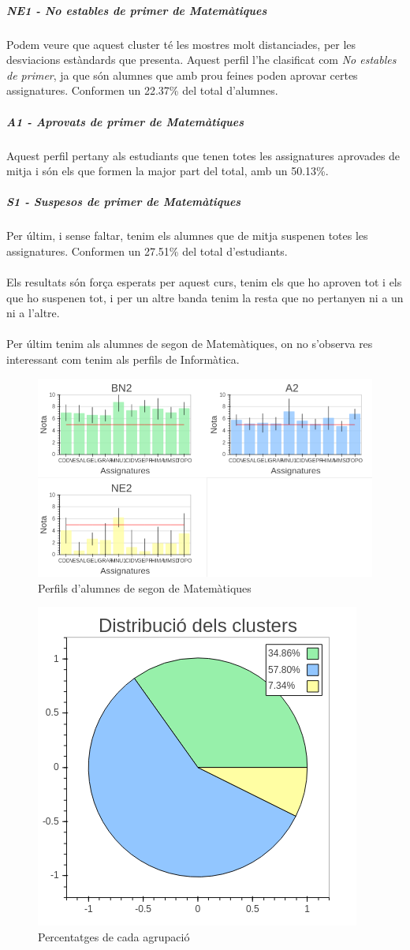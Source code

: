 \documentclass[12pt,a4paper,catalan]{article}
\begin{document}
\subparagraph{NE1 - No estables de primer de Matemàtiques}
Podem veure que aquest cluster té les mostres molt distanciades, per les desviacions estàndards que presenta. Aquest perfil l'he clasificat com \textit{No estables de primer}, ja que són alumnes que amb prou feines poden aprovar certes assignatures. Conformen un 22.37\% del total d'alumnes.

\subparagraph{A1 - Aprovats de primer de Matemàtiques}
Aquest perfil pertany als estudiants que tenen totes les assignatures aprovades  de mitja i són els que formen la major part del total, amb un 50.13\%.

\subparagraph{S1 - Suspesos de primer de Matemàtiques}
Per últim, i sense faltar, tenim els alumnes que de mitja suspenen totes les assignatures. Conformen un 27.51\% del total d'estudiants.
\\
\\
Els resultats són força esperats per aquest curs, tenim els que ho aproven tot i els que ho suspenen tot, i per un altre banda tenim la resta que no pertanyen ni a un ni a l'altre.
\\
\\
Per últim tenim als alumnes de segon de Matemàtiques, on no s'observa res interessant com tenim als perfils de Informàtica.

\begin{figure}[h]
\centering
\includegraphics[width=.85\linewidth]{img/perfils_segon_mates.png}
\caption{Perfils d'alumnes de segon de Matemàtiques}
\end{figure}

\begin{figure}[h]
\centering
\includegraphics[width=.4\linewidth]{img/perfils_segon_mates_pastilla.png}
\caption{Percentatges de cada agrupació}
\end{figure}
\end{document}
